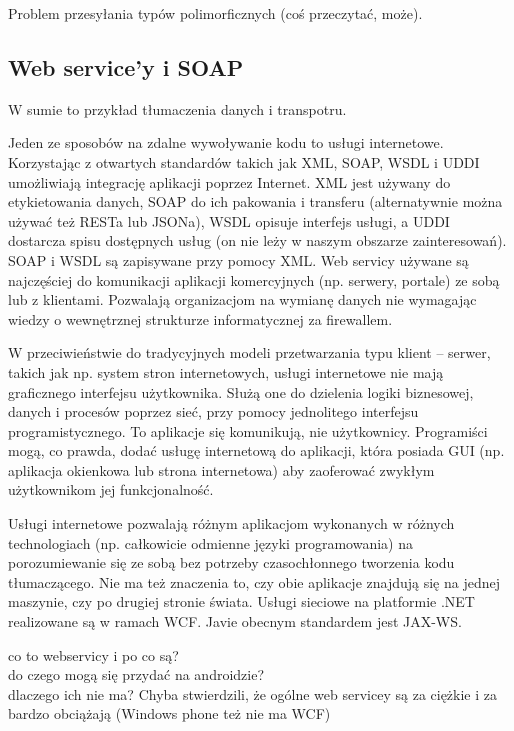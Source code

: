 Problem przesyłania typów polimorficznych (coś przeczytać, może). 

\subsection{Web service'y i SOAP}
W sumie to przykład tłumaczenia danych  i transpotru.

Jeden ze sposobów na zdalne wywoływanie kodu to usługi internetowe. Korzystając z otwartych standardów takich jak XML, SOAP, WSDL i UDDI umożliwiają integrację aplikacji poprzez Internet. XML jest używany do etykietowania danych, SOAP do ich pakowania i transferu (alternatywnie można używać też RESTa lub JSONa), WSDL opisuje interfejs usługi, a UDDI dostarcza spisu dostępnych usług (on nie leży w naszym obszarze zainteresowań). SOAP i WSDL są zapisywane przy pomocy XML. Web servicy używane są najczęściej do komunikacji aplikacji komercyjnych (np. serwery, portale) ze sobą lub z klientami. Pozwalają organizacjom na wymianę danych nie wymagając wiedzy o wewnętrznej strukturze informatycznej za firewallem.

W przeciwieństwie do tradycyjnych modeli przetwarzania typu klient – serwer, takich jak np. system stron internetowych, usługi internetowe nie mają graficznego interfejsu użytkownika. Służą one do dzielenia logiki biznesowej, danych i procesów poprzez sieć, przy pomocy jednolitego interfejsu programistycznego. To aplikacje się komunikują, nie użytkownicy. Programiści mogą, co prawda, dodać usługę internetową do aplikacji, która posiada GUI (np. aplikacja okienkowa lub strona internetowa) aby zaoferować zwykłym użytkownikom jej funkcjonalność.

Usługi internetowe pozwalają różnym aplikacjom wykonanych w różnych technologiach (np. całkowicie odmienne języki programowania) na porozumiewanie się ze sobą bez potrzeby czasochłonnego tworzenia kodu tłumaczącego. Nie ma też znaczenia to, czy obie aplikacje znajdują się na jednej maszynie, czy po drugiej stronie świata.
Usługi sieciowe na platformie .NET realizowane są w ramach WCF. Javie obecnym standardem jest JAX-WS.

co to webservicy i po co są?\\
do czego mogą się przydać na androidzie?\\
dlaczego ich nie ma? Chyba stwierdzili, że ogólne web servicey są za ciężkie i za bardzo obciążają (Windows phone też nie ma WCF)\\

